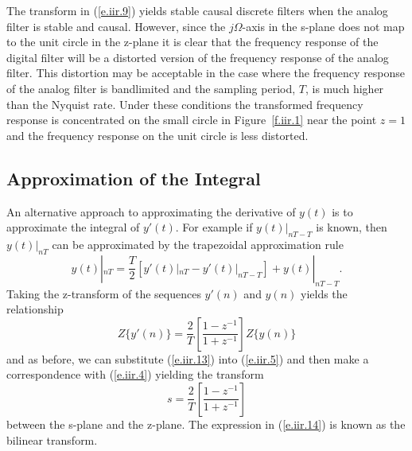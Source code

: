 	The transform in (\ref{e.iir.9}) yields stable causal discrete
filters when the analog filter is stable and causal.  However, since
the $j\Omega$-axis in the s-plane does not map to the unit circle
in the z-plane it is clear that the frequency response of the
digital filter will be a distorted version of the frequency
response of the analog filter.  This distortion may be acceptable
in the case where the frequency response of the analog
filter is bandlimited and the sampling period, $T$,
is much higher than the Nyquist rate.  Under these conditions
the transformed frequency response is concentrated on the small
circle in Figure~\ref{f.iir.1} near the point $z=1$ and the 
frequency response on the unit circle is less distorted.

\subsection{Approximation of the Integral}

	An alternative approach to approximating the 
derivative of $y(t)$ is to approximate the integral of $y'(t)$.
For example if $y(t)|_{nT-T}$ is known, then $y(t)|_{nT}$ can
be approximated by the trapezoidal approximation rule
%
\begin{equation}
y(t)|_{nT}=\frac{T}{2}[y'(t)|_{nT}-y'(t)|_{nT-T}]+y(t)|_{nT-T}.
\label{e.iir.12}
\end{equation}
%
Taking the z-transform of the sequences $y'(n)$ and $y(n)$
yields the relationship
%
\begin{equation}
Z\{y'(n)\}=\frac{2}{T}[\frac{1-z^{-1}}{1+z^{-1}}]Z\{y(n)\}
\label{e.iir.13}
\end{equation}
%
and as before, we can substitute (\ref{e.iir.13}) into (\ref{e.iir.5}) and
then make a correspondence with (\ref{e.iir.4}) yielding the
transform
%
\begin{equation}
s=\frac{2}{T}[\frac{1-z^{-1}}{1+z^{-1}}]
\label{e.iir.14}
\end{equation}
%
between the s-plane and the z-plane.  The expression in (\ref{e.iir.14}) is
known as the bilinear transform.

